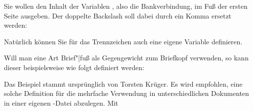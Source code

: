 %
\begin{Example}
  Sie wollen den Inhalt der Variablen ,
  also die Bankverbindung, im Fuß der ersten Seite ausgeben. Der doppelte
  Backslash soll dabei durch ein Komma ersetzt werden:
\begin{lstcode}
\end{lstcode}
  Natürlich können Sie für das Trennzeichen auch eine eigene Variable
  definieren.%
  %
  
  Will man eine Art Brief"|fuß als Gegengewicht zum Briefkopf verwenden, so
  kann dieser beispielsweise wie folgt definiert werden:
\begin{lstcode}
\end{lstcode}
  Das Beispiel stammt ursprünglich von Torsten Krüger. Es wird empfohlen, eine
  solche Definition für die mehrfache Verwendung in unterschiedlichen
  Dokumenten in einer eigenen
  -Datei abzulegen. Mit
\begin{lstcode}
\end{lstcode}
\end{Example}
